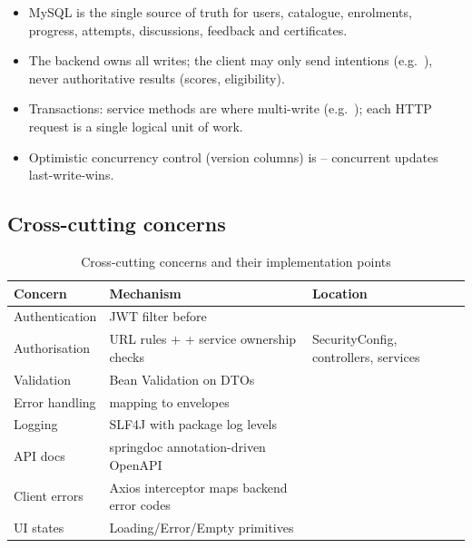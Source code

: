 \begin{itemize}
    \item MySQL is the single source of truth for users, catalogue, enrolments, progress, attempts, discussions, feedback and certificates.
    \item The backend owns all writes; the client may only send intentions (e.g.\ ), never authoritative results (scores, eligibility).
    \item Transactions: service methods are  where multi-write (e.g.\ ); each HTTP request is a single logical unit of work.
    \item Optimistic concurrency control (version columns) is  -- concurrent updates last-write-wins.
\end{itemize}

\subsection{Cross-cutting concerns}
\begin{table}[H]
\centering
\caption{Cross-cutting concerns and their implementation points}
\label{tab:crosscutting}
\begin{tabular}{@{}L{3.4cm}L{6.2cm}L{4.6cm}@{}}
\toprule
\textbf{Concern} & \textbf{Mechanism} & \textbf{Location} \\
\midrule
Authentication & JWT filter before  &  \\
Authorisation & URL rules +  + service ownership checks & SecurityConfig, controllers, services \\
Validation & Bean Validation on DTOs &  \\
Error handling &  mapping to envelopes &  \\
Logging & SLF4J with package log levels &  \\
API docs & springdoc annotation-driven OpenAPI &  \\
Client errors & Axios interceptor maps backend error codes &  \\
UI states & Loading/Error/Empty primitives &  \\
\bottomrule
\end{tabular}
\end{table}
